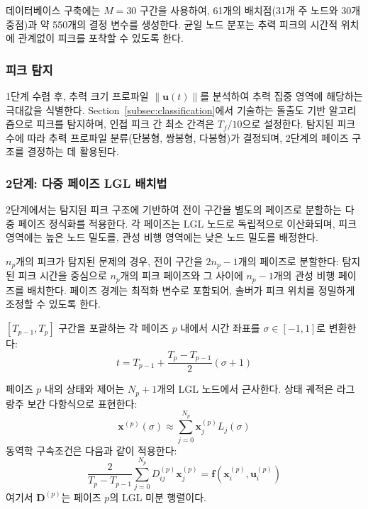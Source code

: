 데이터베이스 구축에는 $M = 30$ 구간을 사용하여, 61개의 배치점(31개 주 노드와 30개 중점)과 약 550개의 결정 변수를 생성한다. 균일 노드 분포는 추력 피크의 시간적 위치에 관계없이 피크를 포착할 수 있도록 한다.

\subsubsection{피크 탐지}

1단계 수렴 후, 추력 크기 프로파일 $\|\mathbf{u}(t)\|$를 분석하여 추력 집중 영역에 해당하는 극대값을 식별한다. Section~\ref{subsec:classification}에서 기술하는 돌출도 기반 알고리즘으로 피크를 탐지하며, 인접 피크 간 최소 간격은 $T_f/10$으로 설정한다. 탐지된 피크 수에 따라 추력 프로파일 분류(단봉형, 쌍봉형, 다봉형)가 결정되며, 2단계의 페이즈 구조를 결정하는 데 활용된다.

\subsubsection{2단계: 다중 페이즈 LGL 배치법}

2단계에서는 탐지된 피크 구조에 기반하여 전이 구간을 별도의 페이즈로 분할하는 다중 페이즈 정식화를 적용한다. 각 페이즈는 LGL 노드로 독립적으로 이산화되며, 피크 영역에는 높은 노드 밀도를, 관성 비행 영역에는 낮은 노드 밀도를 배정한다.

$n_p$개의 피크가 탐지된 문제의 경우, 전이 구간을 $2n_p - 1$개의 페이즈로 분할한다: 탐지된 피크 시간을 중심으로 $n_p$개의 피크 페이즈와 그 사이에 $n_p - 1$개의 관성 비행 페이즈를 배치한다. 페이즈 경계는 최적화 변수로 포함되어, 솔버가 피크 위치를 정밀하게 조정할 수 있도록 한다.

$[T_{p-1}, T_p]$ 구간을 포괄하는 각 페이즈 $p$ 내에서 시간 좌표를 $\sigma \in [-1, 1]$로 변환한다:
\begin{equation}
t = T_{p-1} + \frac{T_p - T_{p-1}}{2}(\sigma + 1)
\end{equation}

페이즈 $p$ 내의 상태와 제어는 $N_p + 1$개의 LGL 노드에서 근사한다. 상태 궤적은 라그랑주 보간 다항식으로 표현한다:
\begin{equation}
\mathbf{x}^{(p)}(\sigma) \approx \sum_{j=0}^{N_p} \mathbf{x}_j^{(p)} L_j(\sigma)
\end{equation}
동역학 구속조건은 다음과 같이 적용한다:
\begin{equation}
\frac{2}{T_p - T_{p-1}} \sum_{j=0}^{N_p} D_{ij}^{(p)} \mathbf{x}_j^{(p)} = \mathbf{f}(\mathbf{x}_i^{(p)}, \mathbf{u}_i^{(p)})
\end{equation}
여기서 $\mathbf{D}^{(p)}$는 페이즈 $p$의 LGL 미분 행렬이다.

